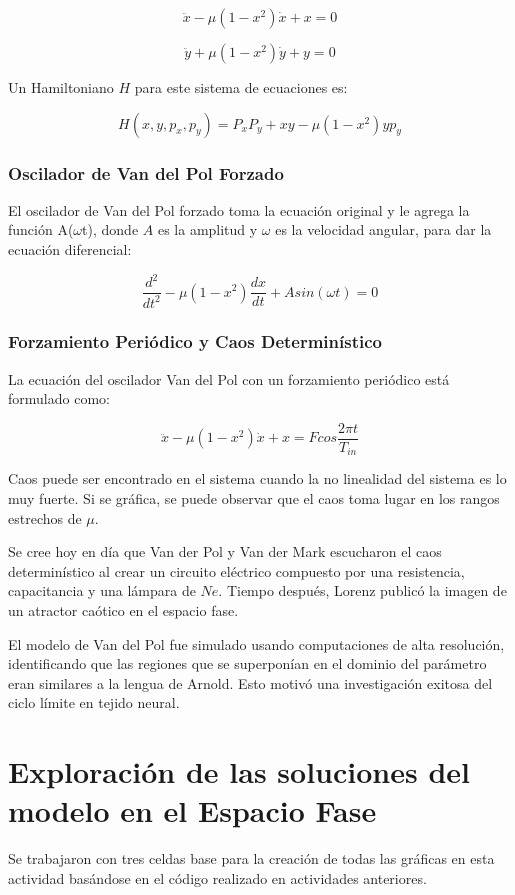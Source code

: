\documentclass{article}
\begin{document}
\[ \ddot{x} - \mu(1 - x^2)\dot{x} + x = 0 \]

\[ \ddot{y} + \mu(1 - x^2)\dot{y} + y = 0 \]

Un Hamiltoniano $H$ para este sistema de ecuaciones es:

\[ H(x, y, p_x, p_y) = P_x P_y + xy - \mu(1 - x^2)yp_y \]


\subsubsection{Oscilador de Van del Pol Forzado}
El oscilador de Van del Pol forzado toma la ecuación original y le agrega la función A($\omega$t), donde $A$ es la amplitud y $\omega$ es la velocidad angular, para dar la ecuación diferencial:

\[ \frac{d^2}{dt^2} - \mu(1 - x^2)\frac{dx}{dt} + Asin(\omega t) = 0 \]


\subsubsection{Forzamiento Periódico y Caos Determinístico}
La ecuación del oscilador Van del Pol con un forzamiento periódico está formulado como:

\[ \ddot{x} - \mu(1 - x^2)\dot{x} + x = Fcos\frac{2 \pi t}{T_{in}} \]

Caos puede ser encontrado en el sistema cuando la no linealidad del sistema es lo muy fuerte. Si se gráfica, se puede observar que el caos toma lugar en los rangos estrechos de $\mu$.

Se cree hoy en día que Van der Pol y Van der Mark escucharon el caos determinístico al crear un circuito eléctrico compuesto por una resistencia, capacitancia y una lámpara de $Ne$. Tiempo después, Lorenz publicó la imagen de un atractor caótico en el espacio fase.

El modelo de Van del Pol fue simulado usando computaciones de alta resolución, identificando que las regiones que se superponían en el dominio del parámetro eran similares a la lengua de Arnold. Esto motivó una investigación exitosa del ciclo límite en tejido neural.



\section{Exploración de las soluciones del modelo en el Espacio Fase}
Se trabajaron con tres celdas base para la creación de todas las gráficas en esta actividad basándose en el código realizado en actividades anteriores. 
\end{document}
